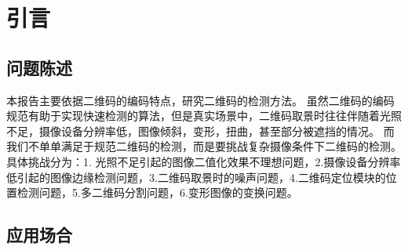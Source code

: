 \section{引言}
\subsection{问题陈述}
本报告主要依据二维码的编码特点，研究二维码的检测方法。
虽然二维码的编码规范有助于实现快速检测的算法，但是真实场景中，二维码取景时往往伴随着光照不足，摄像设备分辨率低，图像倾斜，变形，扭曲，甚至部分被遮挡的情况。
而我们不单单满足于规范二维码的检测，而是要挑战复杂摄像条件下二维码的检测。\\
具体挑战分为：1. 光照不足引起的图像二值化效果不理想问题，2.摄像设备分辨率低引起的图像边缘检测问题，3.二维码取景时的噪声问题，4.二维码定位模块的位置检测问题，5.多二维码分割问题，6.变形图像的变换问题。

\subsection{应用场合}
